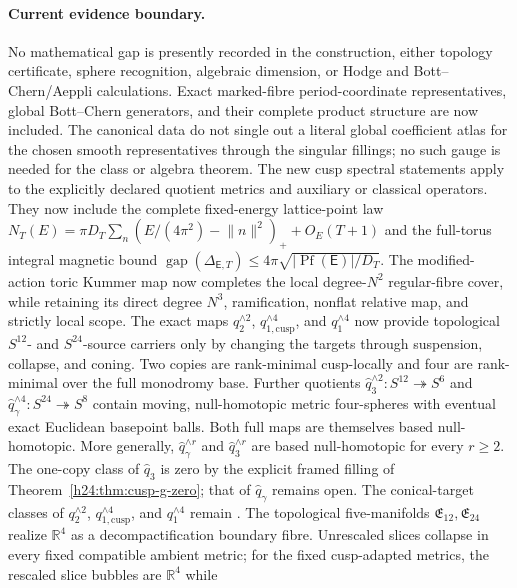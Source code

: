 \paragraph{Current evidence boundary.}
No mathematical gap is presently recorded in the construction, either
topology certificate, sphere recognition, algebraic dimension, or Hodge
and Bott--Chern/Aeppli calculations.  Exact marked-fibre period-coordinate
representatives, global Bott--Chern generators, and their complete product
structure are now included.  The canonical data do not single out a literal
global coefficient atlas for the chosen smooth representatives through the
singular fillings; no such gauge is needed for the class or algebra theorem.
The new cusp spectral statements apply to the explicitly declared quotient
metrics and auxiliary or classical operators.  They now include the complete
fixed-energy lattice-point law
\(N_T(E)=\pi D_T\sum_n(E/(4\pi^2)-\lVert n\rVert^2)_++O_E(T+1)\)
and the full-torus integral magnetic bound
\(\operatorname{gap}(\Delta_{\mathsf E,T})
\le4\pi\sqrt{|\operatorname{Pf}(\mathsf E)|/D_T}\).
The modified-action toric Kummer map now completes the local
degree-\(N^2\) regular-fibre cover, while
retaining its direct degree \(N^3\), ramification, nonflat relative map, and
strictly local scope.  The exact maps \(q_2^{\wedge2}\),
\(q_{1,\mathrm{cusp}}^{\wedge4}\), and \(q_1^{\wedge4}\) now provide
topological \(S^{12}\)- and \(S^{24}\)-source carriers only by changing the
targets through suspension, collapse, and coning.  Two copies are rank-minimal
cusp-locally and four are rank-minimal over the full monodromy base.  Further
quotients \(\widehat q_3^{\wedge2}:S^{12}\twoheadrightarrow S^6\) and
\(\widehat q_\gamma^{\wedge4}:S^{24}\twoheadrightarrow S^8\) contain moving,
null-homotopic metric four-spheres with eventual exact Euclidean basepoint
balls.  Both full maps are themselves based null-homotopic.  More generally,
\(\widehat q_\gamma^{\wedge r}\) and
\(\widehat q_3^{\wedge r}\) are based null-homotopic for every \(r\ge2\).
The one-copy class of \(\widehat q_3\) is zero by the explicit framed
filling of Theorem~\ref{h24:thm:cusp-g-zero}; that of
\(\widehat q_\gamma\) remains open.
The conical-target classes of \(q_2^{\wedge2}\),
\(q_{1,\mathrm{cusp}}^{\wedge4}\), and \(q_1^{\wedge4}\) remain \Open.  The
topological five-manifolds \(\mathfrak E_{12},\mathfrak E_{24}\) realize
\(\mathbb R^4\) as a decompactification boundary fibre.  Unrescaled slices
collapse in every fixed compatible ambient metric; for the fixed
cusp-adapted metrics, the rescaled slice bubbles are \(\mathbb R^4\) while
